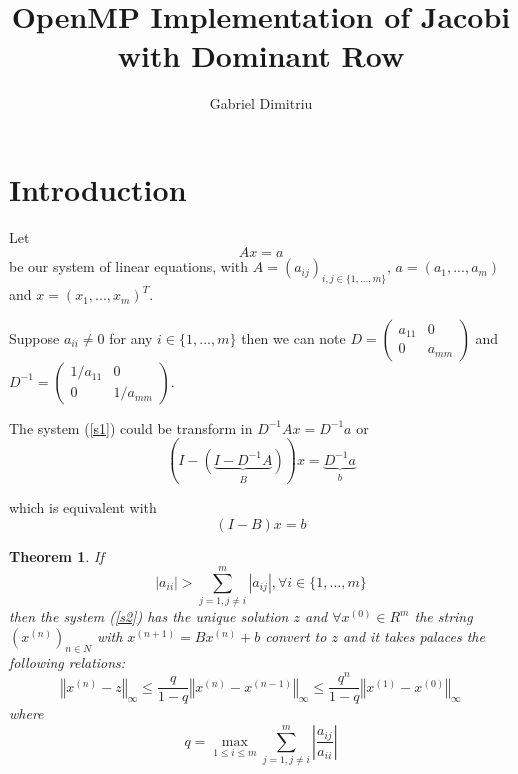 \documentclass[a4paper]{article}
\newtheorem{theorem}{Theorem}
\begin{document}
\title{OpenMP Implementation of Jacobi with Dominant Row}
\date{}
\author{Gabriel Dimitriu}
\maketitle

\section{Introduction}

Let 
\begin{equation}
Ax=a  \label{s1}
\end{equation}
be our system of linear equations, with $A=(a_{ij})_{i,j\in \{1,...,m\}}$, $%
a=(a_{1},...,a_{m})$ and $x=(x_{1},...,x_{m})^{T}$.

Suppose $a_{ii}\neq 0$ for any $i\in \{1,...,m\}$ then we can note $D=%
\begin{pmatrix}
a_{11} & 0 \\ 
0 & a_{mm}%
\end{pmatrix}%
$ and $D^{-1}=%
\begin{pmatrix}
1/a_{11} & 0 \\ 
0 & 1/a_{mm}%
\end{pmatrix}%
$.

The system (\ref{s1}) could be transform in $D^{-1}Ax=D^{-1}a$ or%
\begin{equation*}
\left( I-\underset{B}{\left( \underbrace{I-D^{-1}A}\right) }\right) x=%
\underset{b}{\underbrace{D^{-1}a}}
\end{equation*}

which is equivalent with%
\begin{equation}
(I-B)x=b  \label{s2}
\end{equation}

\begin{theorem}
If 
\begin{equation}
\left\vert a_{ii}\right\vert >\sum_{j=1,j\neq i}^{m}\left\vert
a_{ij}\right\vert ,\forall i\in \{1,...,m\}  \label{s3}
\end{equation}%
then the system (\ref{s2}) has the unique solution $z$ and $\forall
x^{(0)}\in R^{m}$ the string $(x^{(n)})_{n\in N}$ with $x^{(n+1)}=Bx^{(n)}+b$
convert to $z$ and it takes palaces the following relations: 
\begin{equation}
\left\Vert x^{(n)}-z\right\Vert _{\infty }\leq \frac{q}{1-q}\left\Vert
x^{(n)}-x^{(n-1)}\right\Vert _{\infty }\leq \frac{q^{n}}{1-q}\left\Vert
x^{(1)}-x^{(0)}\right\Vert _{\infty }  \label{s4}
\end{equation}%
where 
\begin{equation*}
q=\max_{1\leq i\leq m}\sum_{j=1,j\neq i}^{m}\left\vert \frac{a_{ij}}{a_{ii}}%
\right\vert
\end{equation*}
\end{theorem}
\end{document}
